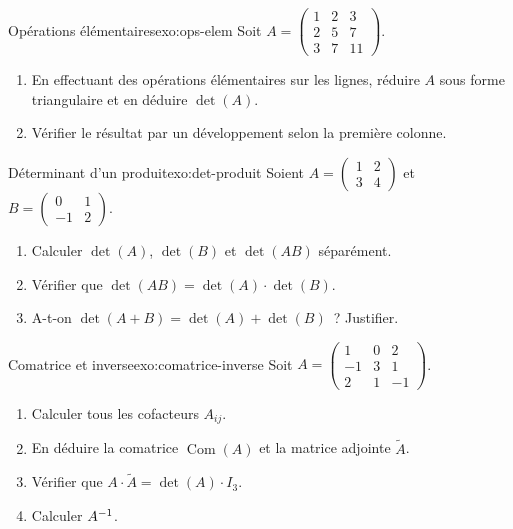 \begin{exercise}{\basic{} Opérations élémentaires}{exo:ops-elem}
  Soit $A=\begin{pmatrix}1&2&3\\2&5&7\\3&7&11\end{pmatrix}$.
  \begin{enumerate}[label=(\alph*)]
    \item En effectuant des opérations élémentaires sur les lignes,
      réduire $A$ sous forme triangulaire et en déduire $\det(A)$.
    \item Vérifier le résultat par un développement selon la première
      colonne.
  \end{enumerate}
\end{exercise}

\begin{exercise}{\intermediate{} Déterminant d'un produit}{exo:det-produit}
  Soient $A=\begin{pmatrix}1&2\\3&4\end{pmatrix}$ et
  $B=\begin{pmatrix}0&1\\-1&2\end{pmatrix}$.
  \begin{enumerate}[label=(\alph*)]
    \item Calculer $\det(A)$, $\det(B)$ et $\det(AB)$ séparément.
    \item Vérifier que $\det(AB)=\det(A)\cdot\det(B)$.
    \item A-t-on $\det(A+B)=\det(A)+\det(B)$~? Justifier.
  \end{enumerate}
\end{exercise}

\begin{exercise}{\intermediate{} Comatrice et inverse}{exo:comatrice-inverse}
  Soit $A=\begin{pmatrix}1&0&2\\-1&3&1\\2&1&-1\end{pmatrix}$.
  \begin{enumerate}[label=(\alph*)]
    \item Calculer tous les cofacteurs $A_{ij}$.
    \item En déduire la comatrice $\operatorname{Com}(A)$ et la matrice
      adjointe $\widetilde{A}$.
    \item Vérifier que $A\cdot\widetilde{A}=\det(A)\cdot I_3$.
    \item Calculer ${A}^{-1}$.
  \end{enumerate}
\end{exercise}

